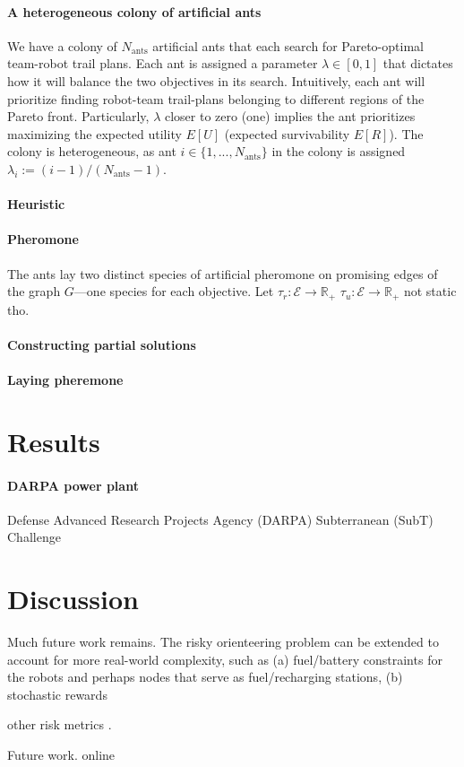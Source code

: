 \documentclass[11pt, oneside]{article}
\begin{document}
\paragraph{A heterogeneous colony of artificial ants} 
We have a colony of $N_{\text{ants}}$ artificial ants that each search for Pareto-optimal team-robot trail plans. Each ant is assigned a parameter $\lambda \in [0, 1]$ that dictates how it will balance the two objectives in its search. Intuitively, each ant will prioritize finding robot-team trail-plans belonging to different regions of the Pareto front. Particularly, $\lambda$ closer to zero (one) implies the ant prioritizes maximizing the expected utility $E[U]$ (expected survivability $E[R]$). The colony is heterogeneous, as ant $i\in\{1, ..., N_{\text{ants}}\}$ in the colony is assigned $\lambda_i := (i-1) / (N_{\text{ants}}-1)$. 

\paragraph{Heuristic}

\paragraph{Pheromone} The ants lay two distinct species of artificial pheromone on promising edges of the graph $G$---one species for each objective. Let $\tau_r:\mathcal{E}\rightarrow \mathbb{R}_+$ $\tau_u:\mathcal{E}\rightarrow \mathbb{R}_+$ 
not static tho.

\paragraph{Constructing partial solutions}

\paragraph{Laying pheremone}

\section{Results}

\paragraph{DARPA power plant}

Defense Advanced Research Projects Agency (DARPA) Subterranean (SubT) Challenge \cite{chung2023into}


\section{Discussion}

Much future work remains.
The risky orienteering problem can be extended to account for more real-world complexity, such as (a) fuel/battery constraints for the robots and perhaps nodes that serve as fuel/recharging stations, (b) stochastic rewards

other risk metrics \cite{majumdar2020should}.

Future work. online




\end{document}
